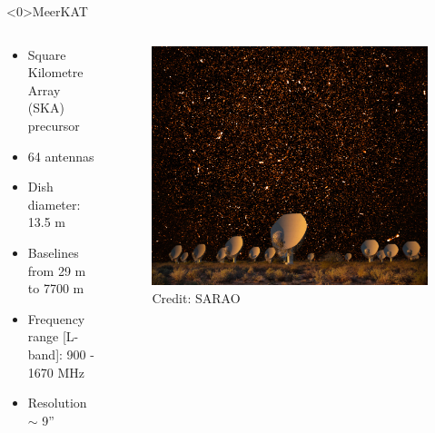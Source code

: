 \documentclass[xetex,aspectratio=169]{beamer}
\begin{document}
\begin{frame}<0>{MeerKAT}
	\begin{columns}[onlytextwidth,t]
		\begin{column}{.5\textwidth}
			\begin{itemize}
				\item Square Kilometre Array (SKA) precursor
				\item 64 antennas
				\item Dish diameter: 13.5 m
				\item Baselines from 29 m to 7700 m
				\item Frequency range [L-band]: 900 - 1670 MHz
				\item Resolution $\sim$ 9''
			\end{itemize}
		\end{column}
		\begin{column}{.5\textwidth}
			\begin{figure}
				\centering
				\includegraphics[width=\textwidth]{figures/MeerKATDeep2_compositeV6.jpg}
				\caption*{Credit: SARAO}
			\end{figure}
		\end{column}%

	\end{columns}
\end{frame}
\end{document}
